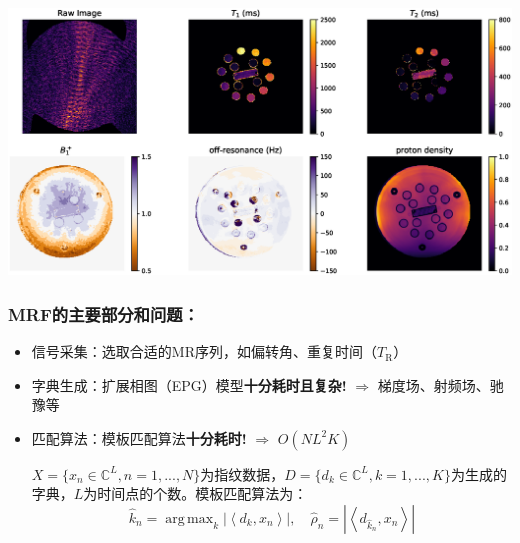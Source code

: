 \documentclass{beamer}
\DeclareMathOperator*{\argmax}{arg\,max}
\begin{document}
\begin{frame}
\hspace{-1.5cm}
	\begin{minipage}{1\textwidth}
		\centering
		\includegraphics[width=1.2\textwidth]{../img/intro/mrfmap}
	\end{minipage}
\end{frame}

\begin{frame}
	\frametitle{MRF的主要部分和问题：}
	\begin{itemize}
		\item 信号采集：选取合适的MR序列，如偏转角、重复时间（$T_\mathrm{R}$）
		\item 字典生成：扩展相图（EPG）模型\textbf{十分耗时且复杂!} $\Rightarrow$ 梯度场、射频场、驰豫等
		\item 匹配算法：模板匹配算法\textbf{十分耗时!} $\Rightarrow$ $O(NL^2K)$
		
		$X=\{x_n\in \mathbb{C}^L, n=1,...,N\}$为指纹数据，$D=\{d_k\in \mathbb{C}^L,k=1,...,K\}$为生成的字典，$L$为时间点的个数。模板匹配算法为：
			\begin{equation*}
	\hat{k}_n = \argmax_k \left|\left\langle d_k,x_n \right\rangle \right|,\quad
	\hat{\rho}_n= \left|\left\langle d_{\hat{k}_n},x_n \right\rangle \right|
	\end{equation*}
	\end{itemize}
	
\end{frame}


\end{document}
